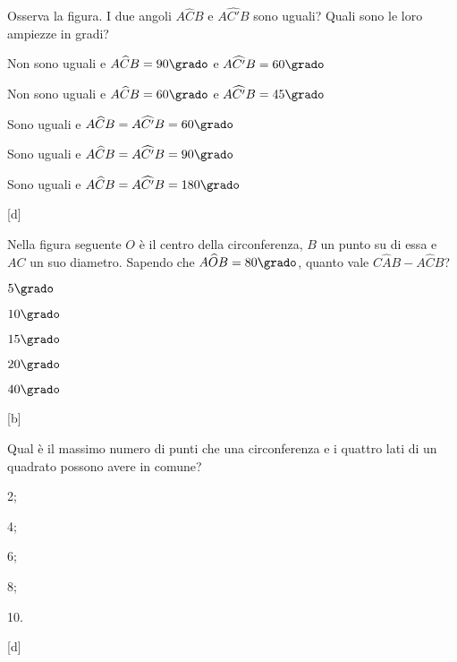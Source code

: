 \noindent\begin{minipage}{0.65\textwidth}\parindent15pt
\begin{esercizio}
\label{ese:5.61}
Osserva la figura. I due angoli $A\widehat{C}B$ e $A\widehat{C'}B$ 
sono uguali? Quali sono le loro ampiezze in gradi?
\begin{enumeratea}
\item Non sono uguali e $A\widehat{C}B=90\grado$ e 
$A\widehat{C'}B=60\grado$
\item Non sono uguali e $A\widehat{C}B=60\grado$ e 
$A\widehat{C'}B=45\grado$
\item Sono uguali e $A\widehat{C}B=A\widehat{C'}B=60\grado$
\item Sono uguali e $A\widehat{C}B=A\widehat{C'}B=90\grado$
\item Sono uguali e $A\widehat{C}B=A\widehat{C'}B=180\grado$
\end{enumeratea}
\hfill [d]
\end{esercizio}
\end{minipage}\hfil
\begin{minipage}{0.35\textwidth}
	\centering
\end{minipage}\vspace{5pt}

\noindent\begin{minipage}{0.7\textwidth}\parindent15pt
\begin{esercizio}
\label{ese:5.62}
Nella figura seguente $O$ è il centro della circonferenza, $B$ un 
punto su di essa e $AC$ un suo diametro. Sapendo che 
$A\widehat{O}B=80\grado$, quanto vale $C\widehat{A}B-A\widehat{C}B$?
\begin{enumeratea}
\item $5\grado$
\item $10\grado$
\item $15\grado$
\item $20\grado$
\item $40\grado$
\end{enumeratea}
\hfill [b]
\end{esercizio}
\end{minipage}\hfil
\begin{minipage}{0.3\textwidth}
	\centering
\end{minipage}\vspace{5pt}

\begin{esercizio}
\label{ese:5.63}
Qual è il massimo numero di punti che una circonferenza e i quattro 
lati di un quadrato possono avere in comune?
\begin{multicols}{5}
\begin{enumeratea}
\item 2;
\item 4;
\item 6;
\item 8;
\item 10.
\end{enumeratea}
\end{multicols}
\hfill [d]
\end{esercizio}

